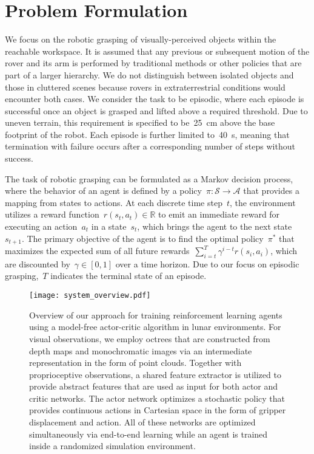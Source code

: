 \section{Problem Formulation}\label{sec:problem-formulation}

We focus on the robotic grasping of visually-perceived objects within the reachable workspace. It is assumed that any previous or subsequent motion of the rover and its arm is performed by traditional methods or other policies that are part of a larger hierarchy. We do not distinguish between isolated objects and those in cluttered scenes because rovers in extraterrestrial conditions would encounter both cases. We consider the task to be episodic, where each episode is successful once an object is grasped and lifted above a required threshold. Due to uneven terrain, this requirement is specified to be~25~cm above the base footprint of the robot. Each episode is further limited to~40~s, meaning that termination with failure occurs after a corresponding number of steps without success.

The task of robotic grasping can be formulated as a Markov decision process, where the behavior of an agent is defined by a policy~\mbox{\(\pi:\mathcal{S}\rightarrow\mathcal{A}\)} that provides a mapping from states to actions. At each discrete time step~\(t\), the environment utilizes a reward function~\mbox{\(r(s_{t},a_{t})\!\in\!\mathbb{R}\)} to emit an immediate reward for executing an action~\(a_{t}\) in a state~\(s_{t}\), which brings the agent to the next state~\(s_{t+1}\). The primary objective of the agent is to find the optimal policy~\(\pi^{*}\) that maximizes the expected sum of all future rewards~\mbox{\(\sum_{i=t}^T \gamma^{i-t}r(s_{i},a_{i})\)}, which are discounted by~\mbox{\(\gamma\!\in\![0, 1]\)} over a time horizon. Due to our focus on episodic grasping,~\(T\) indicates the terminal state of an episode.

\begin{figure*}[thpb]
	\vspace{1.379mm}
	\centering
	\texttt{[image: system\_overview.pdf]}
	\caption{Overview of our approach for training reinforcement learning agents using a model-free actor-critic algorithm in lunar environments. For visual observations, we employ octrees that are constructed from depth maps and monochromatic images via an intermediate representation in the form of point clouds. Together with proprioceptive observations, a shared feature extractor is utilized to provide abstract features that are used as input for both actor and critic networks. The actor network optimizes a stochastic policy that provides continuous actions in Cartesian space in the form of gripper displacement and action. All of these networks are optimized simultaneously via end-to-end learning while an agent is trained inside a randomized simulation environment.}
	\label{fig:system-overview}
\end{figure*}

